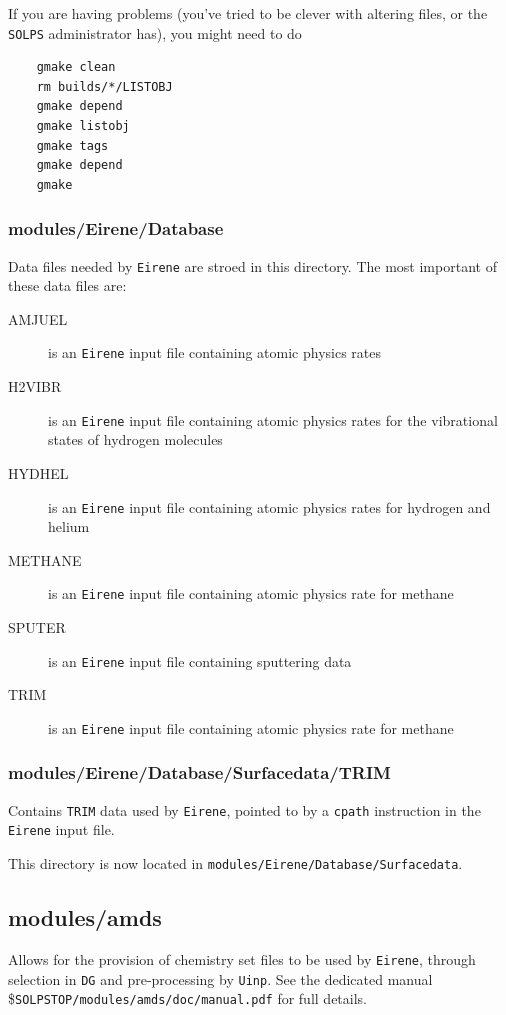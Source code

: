 \documentclass[a4paper,10pt]{report}
\begin{document}
If you are having problems (you've tried to be clever with altering
files, or the {\tt SOLPS} administrator has), you might need to do
\begin{verbatim}
    gmake clean
    rm builds/*/LISTOBJ
    gmake depend
    gmake listobj
    gmake tags
    gmake depend
    gmake
\end{verbatim}

\subsubsection{modules/Eirene/Database}

Data files needed by {\tt Eirene} are stroed in this directory.
The most important of these data files are:
\begin{description}
\item[AMJUEL]  is an {\tt Eirene} input file containing atomic
  physics rates
\item[H2VIBR]  is an {\tt Eirene} input file containing atomic
  physics rates for the vibrational states of hydrogen molecules
\item[HYDHEL]  is an {\tt Eirene} input file containing atomic
  physics rates for hydrogen and helium
\item[METHANE]  is an {\tt Eirene} input file containing atomic
  physics rate for methane
\item[SPUTER]  is an {\tt Eirene} input file containing
  sputtering data
\item[TRIM]  is an {\tt Eirene} input file containing atomic
  physics rate for methane
\end{description}

\subsubsection{modules/Eirene/Database/Surfacedata/TRIM}

Contains {\tt TRIM} data used by {\tt Eirene}, pointed to by a {\tt cpath}
instruction in the {\tt Eirene} input file.

This directory is now located in {\tt modules/Eirene/Database/Surfacedata}.

\subsection{modules/amds}

Allows for the provision of chemistry set files to be used by {\tt Eirene}, through selection in {\tt DG} and
pre-processing by {\tt Uinp}. See the dedicated manual \${\tt {SOLPSTOP}/modules/amds/doc/manual.pdf} for full
details.
\end{document}
